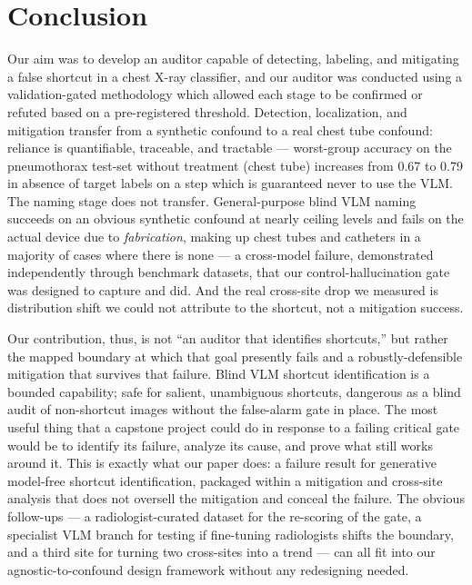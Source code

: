\documentclass{ieeeaccess}
\begin{document}
\section{Conclusion}
Our aim was to develop an auditor capable of detecting, labeling, and mitigating a false shortcut in a chest X-ray classifier, and our auditor was conducted using a validation-gated methodology which allowed each stage to be confirmed or refuted based on a pre-registered threshold. Detection, localization, and mitigation transfer from a synthetic confound to a real chest tube confound: reliance is quantifiable, traceable, and tractable --- worst-group accuracy on the pneumothorax test-set without treatment (chest tube) increases from 0.67 to 0.79 in absence of target labels on a step which is guaranteed never to use the VLM. The naming stage does not transfer. General-purpose blind VLM naming succeeds on an obvious synthetic confound at nearly ceiling levels and fails on the actual device due to \emph{fabrication}, making up chest tubes and catheters in a majority of cases where there is none --- a cross-model failure, demonstrated independently through benchmark datasets, that our control-hallucination gate was designed to capture and did. And the real cross-site drop we measured is distribution shift we could not attribute to the shortcut, not a mitigation success.

Our contribution, thus, is not ``an auditor that identifies shortcuts,'' but rather the mapped boundary at which that goal presently fails and a robustly-defensible mitigation that survives that failure. Blind VLM shortcut identification is a bounded capability; safe for salient, unambiguous shortcuts, dangerous as a blind audit of non-shortcut images without the false-alarm gate in place. The most useful thing that a capstone project could do in response to a failing critical gate would be to identify its failure, analyze its cause, and prove what still works around it. This is exactly what our paper does: a failure result for generative model-free shortcut identification, packaged within a mitigation and cross-site analysis that does not oversell the mitigation and conceal the failure. The obvious follow-ups --- a radiologist-curated dataset for the re-scoring of the gate, a specialist VLM branch for testing if fine-tuning radiologists shifts the boundary, and a third site for turning two cross-sites into a trend --- can all fit into our agnostic-to-confound design framework without any redesigning needed.
\end{document}
